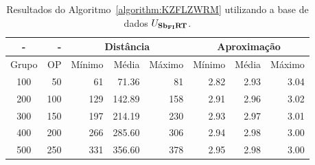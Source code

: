 \begin{table}[!htb]
  \caption{Resultados do Algoritmo~\ref{algorithm:KZFLZWRM} utilizando a base de dados $U_{\textbf{Sb\textsubscript{FI}RT}}{}$.}
  \label{table:DRUHLZFM}
  \centering
  \begin{tabular}{|c|r|r|r|r|r|r|r|}
    \hline
      -      &  -   & \multicolumn{3}{c|}{Distância}             & \multicolumn{3}{c|}{Aproximação}           \\ \hline
    Grupo    & OP   & Mínimo       & Média        & Máximo       & Mínimo       & Média        & Máximo       \\ \hline  
    100      & 50   & 61           &  71.36       &  81          & 2.82         & 2.93         & 3.04         \\ \hline
    200      & 100  & 129          & 142.89       & 158          & 2.91         & 2.96         & 3.02         \\ \hline
    300      & 150  & 197          & 214.19       & 230          & 2.93         & 2.97         & 3.01         \\ \hline
    400      & 200  & 266          & 285.60       & 306          & 2.94         & 2.98         & 3.00         \\ \hline
    500      & 250  & 331          & 356.60       & 378          & 2.95         & 2.98         & 3.00         \\ \hline    
  \end{tabular}
\end{table}